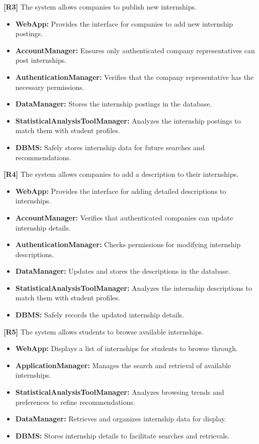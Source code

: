 \textbf{[R3]} The system allows companies to publish new internships.  
\begin{itemize}
    \item \textbf{WebApp:} Provides the interface for companies to add new internship postings.
    \item \textbf{AccountManager:} Ensures only authenticated company representatives can post internships.
    \item \textbf{AuthenticationManager:} Verifies that the company representative has the necessary permissions.
    \item \textbf{DataManager:} Stores the internship postings in the database.
    \item \textbf{StatisticalAnalysisToolManager:} Analyzes the internship postings to match them with student profiles.
    \item \textbf{DBMS:} Safely stores internship data for future searches and recommendations.
\end{itemize}

\textbf{[R4]} The system allows companies to add a description to their internships.  
\begin{itemize}
    \item \textbf{WebApp:} Provides the interface for adding detailed descriptions to internships.
    \item \textbf{AccountManager:} Verifies that authenticated companies can update internship details.
    \item \textbf{AuthenticationManager:} Checks permissions for modifying internship descriptions.
    \item \textbf{DataManager:} Updates and stores the descriptions in the database.
    \item \textbf{StatisticalAnalysisToolManager:} Analyzes the internship descriptions to match them with student profiles.
    \item \textbf{DBMS:} Safely records the updated internship details.
\end{itemize}

\textbf{[R5]} The system allows students to browse available internships.  
\begin{itemize}
    \item \textbf{WebApp:} Displays a list of internships for students to browse through.
    \item \textbf{ApplicationManager:} Manages the search and retrieval of available internships.
    \item \textbf{StatisticalAnalysisToolManager:} Analyzes browsing trends and preferences to refine recommendations.
    \item \textbf{DataManager:} Retrieves and organizes internship data for display.
    \item \textbf{DBMS:} Stores internship details to facilitate searches and retrievals.
\end{itemize}

